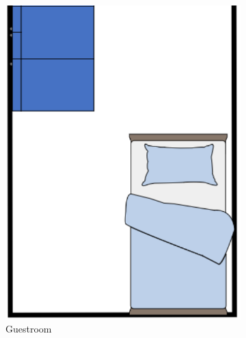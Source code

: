 \begin{figure}[H]
    \centering
    
    \begin{subfigure}{0.35\textwidth}
        \centering
        \includegraphics[width=\linewidth]{figures/Liveroom1.png}
        \caption{Guestroom}
        \label{fig:Liveroom1}
    \end{subfigure}
    \hfill
    \begin{subfigure}{0.35\textwidth}
        \centering

\end{subfigure}
\end{figure}
